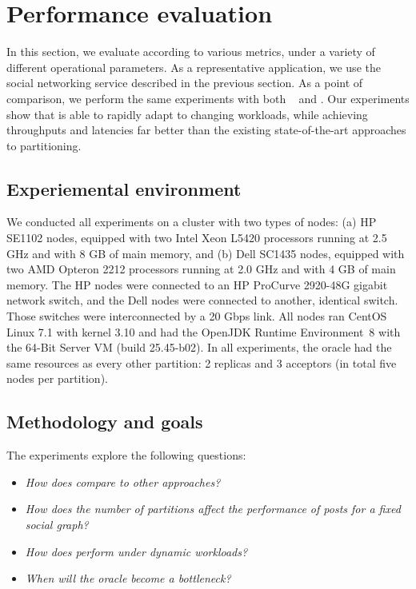 \section{Performance evaluation}
\label{sec:experiments}

In this section, we evaluate \dynastar{} according to various metrics,
under a variety of different operational parameters.  As a
representative application, we use the \appname{} social networking
service described in the previous section.  As a point of comparison,
we perform the same experiments with both
\ssmr{}~\cite{bezerra2014ssmr} and \dssmr. Our experiments show that
\dynastar{} is able to rapidly adapt to changing workloads, while
achieving throughputs and latencies far better than the existing
state-of-the-art approaches to partitioning.


\subsection{Experiemental environment}
\label{sec:evaluation:setup}

We conducted all experiments on a cluster with two types of nodes: (a)
HP SE1102 nodes, equipped with two Intel Xeon L5420 processors running
at 2.5 GHz and with 8 GB of main memory, and (b) Dell SC1435 nodes,
equipped with two AMD Opteron 2212 processors running at 2.0 GHz and
with 4 GB of main memory. The HP nodes were connected to an HP
ProCurve 2920-48G gigabit network switch, and the Dell nodes were
connected to another, identical switch. Those switches were
interconnected by a 20 Gbps link.  All nodes ran CentOS Linux 7.1 with
kernel 3.10 and had the OpenJDK Runtime Environment~8 with the
\mbox{64-Bit} Server VM (build 25.45-b02). In all experiments, the oracle 
had the same resources as every other partition: 2 replicas and 3 acceptors 
(in total five nodes per partition).


\subsection{Methodology and goals}
\label{sec:evaluation:methodology}

The experiments explore the following questions:
\begin{itemize}
\item \emph{How does \dynastar compare to other approaches?} 
\item \emph{How does the number of partitions affect the performance of posts for a fixed social graph?}
\item \emph{How does \dynastar perform under dynamic workloads?}
\item \emph{When will the oracle become a bottleneck?}
\end{itemize}



